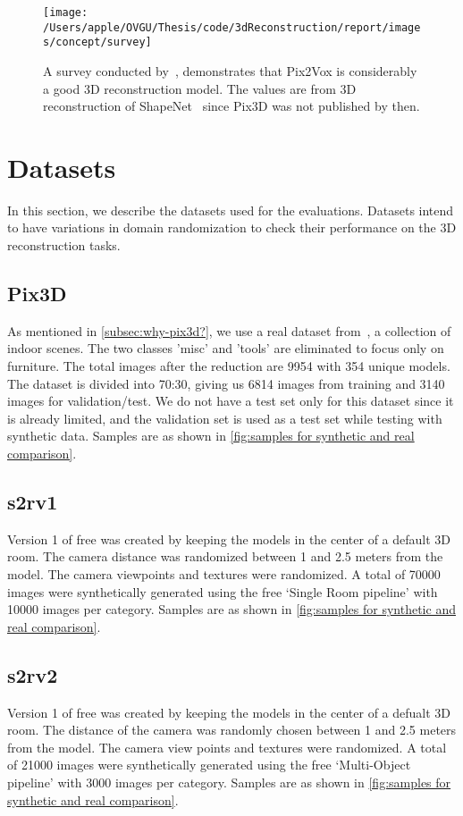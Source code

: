 \begin{figure}[ht]
    \centering
    \texttt{[image: /Users/apple/OVGU/Thesis/code/3dReconstruction/report/images/concept/survey]}
    \caption[Survey Results for 3D-Reconstruction.]{A survey conducted by~\cite{Han2021ImageBased3O}, demonstrates that Pix2Vox is considerably a good 3D reconstruction model.
    The values are from 3D reconstruction of ShapeNet~\cite{shapenet2015} since Pix3D was not published by then.}
    \label{fig:survey on 3d reconstruction}
\end{figure}


\section{Datasets}\label{sec:datasets}
In this section, we describe the datasets used for the evaluations.
Datasets intend to have variations in domain randomization to check their performance on the 3D reconstruction tasks.

\subsection{Pix3D}\label{subsec:pix3d}
As mentioned in \autoref{subsec:why-pix3d?}, we use a real dataset from~\cite{Sun2018}, a collection of indoor scenes.
The two classes ’misc’ and ’tools’ are eliminated to focus only on furniture.
The total images after the reduction are 9954 with 354 unique models.
The dataset is divided into 70:30, giving us 6814 images from training and 3140 images for validation/test.
We do not have a test set only for this dataset since it is already limited, and the validation set is used as a test set while testing with synthetic data.
Samples are as shown in \autoref{fig:samples for synthetic and real comparison}.

\subsection{\gls{s2rv1}}\label{subsec:gls{free}-version-1}
Version 1 of \gls{free} was created by keeping the models in the center of a default 3D room.
The camera distance was randomized between 1 and 2.5 meters from the model.
The camera viewpoints and textures were randomized.
A total of 70000 images were synthetically generated using the \gls{free} `Single Room pipeline' with 10000 images per category.
Samples are as shown in \autoref{fig:samples for synthetic and real comparison}.

\subsection{\gls{s2rv2}}\label{subsec:gls{free}-version-2}
Version 1 of \gls{free} was created by keeping the models in the center of a defualt 3D room.
The distance of the camera was randomly chosen between 1 and 2.5 meters from the model.
The camera view points and textures were randomized.
A total of 21000 images were synthetically generated using the \gls{free} `Multi-Object pipeline' with 3000 images per category.
Samples are as shown in \autoref{fig:samples for synthetic and real comparison}.

